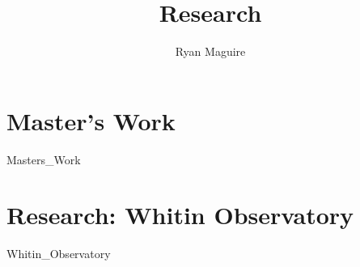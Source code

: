 \documentclass[crop=false,class=book,oneside]{standalone}
\begin{document}
    \newif\ifresearch
    \ifstandalone
        \title{Research}
        \author{Ryan Maguire}
        \date{\vspace{-5ex}}
        \maketitle
        \tableofcontents
        \listoffigures
        \listoftables
        \clearpage
    \fi
    \part{Master's Work}
        {Masters_Work}
    \part{Research: Whitin Observatory}
        {Whitin_Observatory}
    \ifstandalone
        
    \fi
\end{document}
